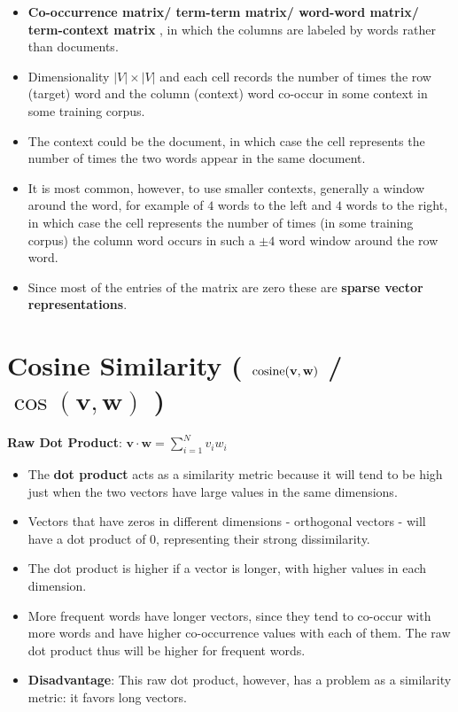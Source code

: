 \begin{itemize}
    \item \textbf{Co-occurrence matrix/ term-term matrix/ word-word matrix/ term-context matrix}   , in which the columns are labeled by words rather than documents. 
    
    \item Dimensionality $|V|\times|V|$ and each cell records the number of times the row (target) word and the column (context) word co-occur in some context in some training corpus.

    \item The context could be the document, in which case the cell represents the number of times the two words appear in the same document.

    \item It is most common, however, to use smaller contexts, generally a window around the word, for example of $4$ words to the left and $4$ words to the right, in which case the cell represents the number of times (in some training corpus) the column word occurs in such a $\pm 4$ word window around the row word.

    \item Since most of the entries of the matrix are zero these are \textbf{sparse vector representations}.
\end{itemize}



\section{Cosine Similarity ( $\operatorname{cosine}(\mathbf{v,w})$ / $\cos(\mathbf{v,w})$ ) \cite{nlp-1}}\label{Cosine Similarity}

\textbf{Raw Dot Product}: \( \displaystyle\mathbf{v \cdot w} = \sum_{i=1}^{N} v_i w_i \)

\begin{itemize}
    \item The \textbf{dot product} acts as a similarity metric because it will tend to be high just when the two vectors have large values in the same dimensions. 
    
    \item Vectors that have zeros in different dimensions - orthogonal vectors - will have a dot product of 0, representing their strong dissimilarity.

    \item The dot product is higher if a vector is longer, with higher values in each dimension.
    
    \item More frequent words have longer vectors, since they tend to co-occur with more words and have higher co-occurrence values with each of them. The raw dot product thus will be higher for frequent words.

    \item \textbf{Disadvantage}: This raw dot product, however, has a problem as a similarity metric: it favors long vectors.

    
\end{itemize}


